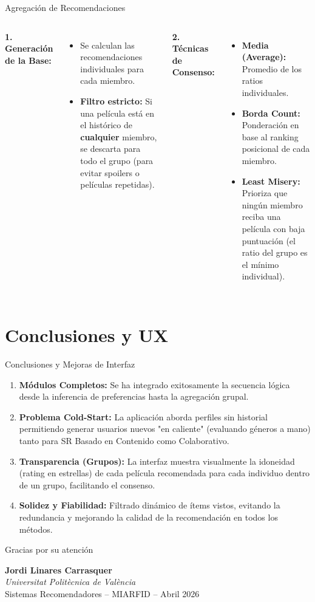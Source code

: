 \documentclass[aspectratio=169]{beamer}
\begin{document}
\begin{frame}{Agregación de Recomendaciones}
  \begin{columns}[T]
      \textbf{1. Generación de la Base:}
      \begin{itemize}
        \item Se calculan las recomendaciones individuales para cada miembro.
        \item \textbf{Filtro estricto:} Si una película está en el histórico de \textbf{cualquier} miembro, se descarta para todo el grupo (para evitar spoilers o películas repetidas).
      \end{itemize}

      \textbf{2. Técnicas de Consenso:}
      \begin{itemize}
        \item \textbf{Media (Average):} Promedio de los ratios individuales.
        \item \textbf{Borda Count:} Ponderación en base al ranking posicional de cada miembro.
        \item \textbf{Least Misery:} Prioriza que ningún miembro reciba una película con baja puntuación (el ratio del grupo es el mínimo individual).
      \end{itemize}
  \end{columns}
\end{frame}

\section{Conclusiones y UX}

\begin{frame}{Conclusiones y Mejoras de Interfaz}
  \begin{enumerate}
    \item \textbf{Módulos Completos:} Se ha integrado exitosamente la secuencia lógica desde la inferencia de preferencias hasta la agregación grupal.
    \item \textbf{Problema Cold-Start:} La aplicación aborda perfiles sin historial permitiendo generar usuarios nuevos "en caliente" (evaluando géneros a mano) tanto para SR Basado en Contenido como Colaborativo.
    \item \textbf{Transparencia (Grupos):} La interfaz muestra visualmente la idoneidad (rating en estrellas) de cada película recomendada para cada individuo dentro de un grupo, facilitando el consenso.
    \item \textbf{Solidez y Fiabilidad:} Filtrado dinámico de ítems vistos, evitando la redundancia y mejorando la calidad de la recomendación en todos los métodos.
  \end{enumerate}
\end{frame}

\begin{frame}{}
  \centering
  \Large Gracias por su atención

  \vspace{1cm}
  \normalsize
  \textbf{Jordi Linares Carrasquer}\\
  \textit{Universitat Politècnica de València}\\

  \vspace{0.5cm}
  \footnotesize
  Sistemas Recomendadores -- MIARFID -- Abril 2026
\end{frame}
\end{document}
